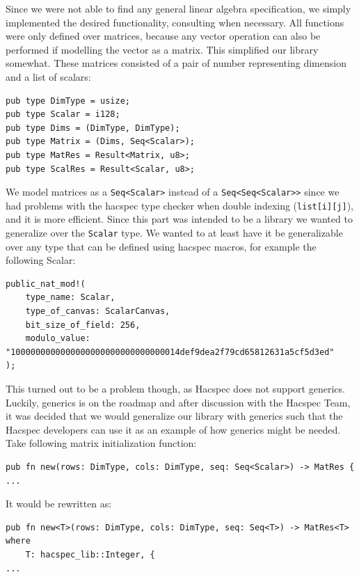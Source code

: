 \documentclass{article}
\begin{document}
Since we were not able to find any general linear algebra
specification, we simply implemented the desired functionality,
consulting \cite{linear-algebra} when necessary. All functions were
only defined over matrices, because any vector operation can also
be performed if modelling the vector as a matrix. This simplified
our library somewhat. These matrices consisted of a pair of number
representing dimension and a list of scalars:

\begin{lstlisting}
pub type DimType = usize;
pub type Scalar = i128;
pub type Dims = (DimType, DimType);
pub type Matrix = (Dims, Seq<Scalar>);
pub type MatRes = Result<Matrix, u8>;
pub type ScalRes = Result<Scalar, u8>;
\end{lstlisting}

We model matrices as a \texttt{Seq<Scalar>} instead of a
\texttt{Seq<Seq<Scalar>>} since we had problems with the hacspec type
checker when double indexing (\texttt{list[i][j]}), and it is more
efficient. Since this part was intended to be a library we wanted to
generalize over the \texttt{Scalar} type. We wanted to at least have
it be generalizable over any type that can be defined using hacspec
macros, for example the following Scalar:

\begin{lstlisting}
public_nat_mod!(
    type_name: Scalar,
    type_of_canvas: ScalarCanvas,
    bit_size_of_field: 256,
    modulo_value: "1000000000000000000000000000000014def9dea2f79cd65812631a5cf5d3ed"
);
\end{lstlisting}

This turned out to be a problem though, as Hacspec does not support
generics. Luckily, generics is on the roadmap and after discussion
with the Hacspec Team, it was decided that we would generalize our
library with generics such that the Hacspec developers can use it
as an example of how generics might be needed. Take following matrix
initialization function:

\begin{lstlisting}
pub fn new(rows: DimType, cols: DimType, seq: Seq<Scalar>) -> MatRes {
...
\end{lstlisting}

It would be rewritten as:

\begin{lstlisting}
pub fn new<T>(rows: DimType, cols: DimType, seq: Seq<T>) -> MatRes<T>
where
    T: hacspec_lib::Integer, {
...
\end{lstlisting}
\end{document}
